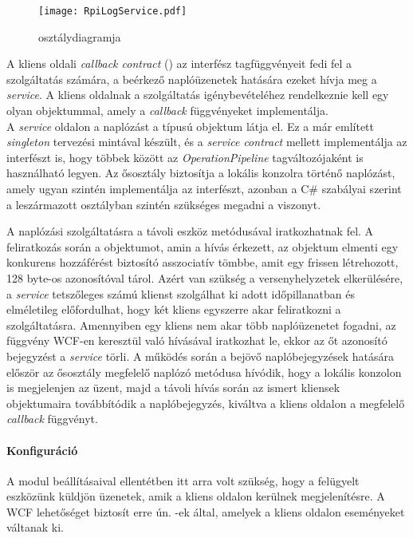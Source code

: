 \begin{figure}[h]
\vspace{.5cm}
\texttt{[image: RpiLogService.pdf]}
\centering
\vspace{.2cm}
\caption{ osztálydiagramja}
\vspace{.5cm}
\label{fig:RpiLogService_class}
\end{figure}

A kliens oldali \emph{callback contract} () az  interfész tagfüggvényeit fedi fel a szolgáltatás számára, a beérkező naplóüzenetek hatására ezeket hívja meg a \emph{service}. A kliens oldalnak a szolgáltatás igénybevételéhez rendelkeznie kell egy olyan objektummal, amely a \emph{callback} függvényeket implementálja.\\
A \emph{service} oldalon a naplózást a  típusú objektum látja el. Ez a már említett \emph{singleton} tervezési mintával készült, és a \emph{service contract} mellett implementálja az  interfészt is, hogy többek között az \emph{OperationPipeline} tagváltozójaként is használható legyen. Az ősosztály biztosítja a lokális konzolra történő naplózást, amely ugyan szintén implementálja az  interfészt, azonban a C\# szabályai szerint a leszármazott osztályban szintén szükséges megadni a viszonyt. \cite{cs-in-a-nutshell}

A naplózási szolgáltatásra a távoli eszköz  metódusával iratkozhatnak fel. A feliratkozás során a  objektumot, amin a hívás érkezett, az objektum elmenti egy konkurens hozzáférést biztosító asszociatív tömbbe, amit egy frissen létrehozott, 128 byte-os azonosítóval tárol. Azért van szükség a versenyhelyzetek elkerülésére, a \emph{service} tetszőleges számú klienst szolgálhat ki adott időpillanatban és elméletileg előfordulhat, hogy két kliens egyszerre akar feliratkozni a szolgáltatásra. Amennyiben egy kliens nem akar több naplóüzenetet fogadni, az  függvény WCF-en keresztül való hívásával iratkozhat le, ekkor az őt azonosító bejegyzést a \emph{service} törli. A működés során a bejövő naplóbejegyzések hatására először az ősosztály megfelelő naplózó metódusa hívódik, hogy a lokális konzolon is megjelenjen az üzent, majd a távoli hívás során az ismert kliensek  objektumaira továbbítódik a naplóbejegyzés, kiváltva a kliens oldalon a megfelelő \emph{callback} függvényt.

\paragraph{Konfiguráció} A  modul beállításaival ellentétben itt arra volt szükség, hogy a felügyelt eszközünk küldjön üzenetek, amik a kliens oldalon kerülnek megjelenítésre. A WCF lehetőséget biztosít erre ún. -ek által, amelyek a kliens oldalon eseményeket váltanak ki.

